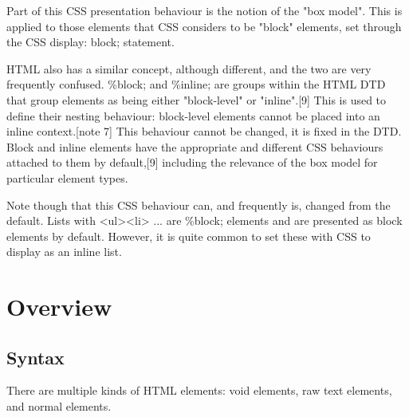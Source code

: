 Part of this CSS presentation behaviour is the notion of the "box model". This is applied to those elements that CSS considers to be "block" elements, set through the CSS display: block; statement.

HTML also has a similar concept, although different, and the two are very frequently confused. \%block; and \%inline; are groups within the HTML DTD that group elements as being either "block-level" or "inline".[9] This is used to define their nesting behaviour: block-level elements cannot be placed into an inline context.[note 7] This behaviour cannot be changed, it is fixed in the DTD. Block and inline elements have the appropriate and different CSS behaviours attached to them by default,[9] including the relevance of the box model for particular element types.

Note though that this CSS behaviour can, and frequently is, changed from the default. Lists with <ul><li> ... are \%block; elements and are presented as block elements by default. However, it is quite common to set these with CSS to display as an inline list.






\chapter{Overview}

\section{Syntax}


There are multiple kinds of HTML elements: void elements, raw text elements, and normal elements.


